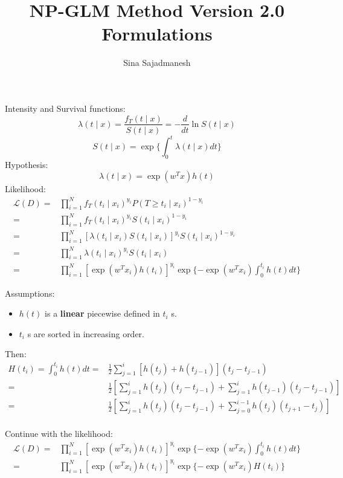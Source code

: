 \documentclass[]{article}
\title{NP-GLM Method Version 2.0 Formulations}
\author{Sina Sajadmanesh}
\begin{document}
\maketitle

Intensity and Survival functions:
\[\lambda(t\mid x)=\frac{f_T(t\mid x)}{S(t\mid x)}=-\frac{d}{dt}\ln S(t\mid x) \]
\[S(t\mid x)=\exp\{\int_{0}^{t}\lambda(t\mid x)dt\}\]
Hypothesis: 
\[\lambda(t\mid x)=\exp(w^Tx)h(t)\]
Likelihood:
\begin{equation*}
\begin{split}
\mathcal{L}(D)=&\prod_{i=1}^{N}f_T(t_i\mid x_i)^{y_i}P(T\ge t_i\mid x_i)^{1-y_i}\\
=&\prod_{i=1}^{N}f_T(t_i\mid x_i)^{y_i}S(t_i\mid x_i)^{1-y_i}\\
=&\prod_{i=1}^{N}[\lambda(t_i\mid x_i)S(t_i\mid x_i)]^{y_i}S(t_i\mid x_i)^{1-y_i}\\
=&\prod_{i=1}^{N}\lambda(t_i\mid x_i)^{y_i}S(t_i\mid x_i)\\
=&\prod_{i=1}^{N}\left[\exp(w^Tx_i)h(t_i)\right]^{y_i}\exp\lbrace-\exp(w^Tx_i)\int_{0}^{t_i}h(t)dt\rbrace
\end{split}
\end{equation*}

Assumptions:
\begin{itemize}
\item $h(t)$ is a \textbf{linear} piecewise defined in $t_i$ s.
\item $t_i$ s are sorted in increasing order.
\end{itemize}

Then:
\begin{align*}
H(t_i)=\int_{0}^{t_i}h(t)dt=&\frac{1}{2}\sum_{j=1}^{i}\left[h(t_j)+h(t_{j-1})\right](t_j-t_{j-1})\\
=&\frac{1}{2}\left[\sum_{j=1}^{i}h(t_j)(t_j-t_{j-1})+\sum_{j=1}^{i}h(t_{j-1})(t_j-t_{j-1})\right]\\
=&\frac{1}{2}\left[\sum_{j=1}^{i}h(t_j)(t_j-t_{j-1})+\sum_{j=0}^{i-1}h(t_j)(t_{j+1}-t_j)\right]\\
\end{align*}

Continue with the likelihood:
\begin{equation*}
\begin{split}
\mathcal{L}(D)
=&\prod_{i=1}^{N}\left[\exp(w^Tx_i)h(t_i)\right]^{y_i}\exp\lbrace-\exp(w^Tx_i)\int_{0}^{t_i}h(t)dt\rbrace\\
=&\prod_{i=1}^{N}\left[\exp(w^Tx_i)h(t_i)\right]^{y_i}\exp\lbrace-\exp(w^Tx_i)H(t_i)\rbrace\\
\end{split}
\end{equation*}
\end{document}
